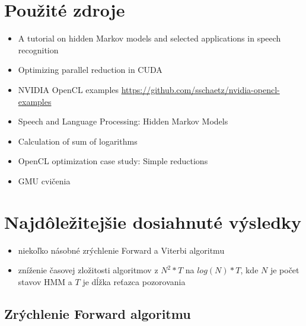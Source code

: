 \documentclass[11pt,a4paper]{article}
\begin{document}
\section{Použité zdroje}
\begin{itemize}
\item A tutorial on hidden Markov models and selected applications in speech recognition \cite{rabiner}
\item Optimizing parallel reduction in CUDA \cite{cuda-reductions}
\item NVIDIA OpenCL examples \url{https://github.com/sschaetz/nvidia-opencl-examples}
\item Speech and Language Processing: Hidden Markov Models \cite{jurafsky_martin}
\item Calculation of sum of logarithms \cite{computing-log-sum}
\item OpenCL optimization case study: Simple reductions \cite{amd-reductions}
\item GMU cvičenia
\end{itemize}



\section{Najdôležitejšie dosiahnuté výsledky}
\begin{itemize}
\item niekoľko násobné zrýchlenie Forward a Viterbi algoritmu
\item zníženie časovej zložitosti algoritmov z $N^{2}*T$ na $log(N)*T$, kde $N$ je počet stavov HMM a $T$ je dĺžka reťazca pozorovania
\end{itemize}

\subsection{Zrýchlenie Forward algoritmu}
\end{document}
